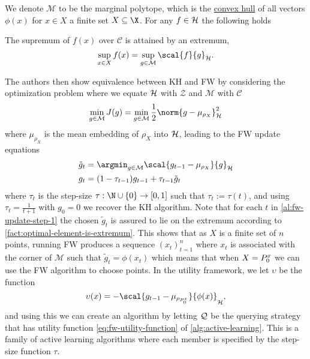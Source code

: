 We denote \(\mathcal{M}\) to be the marginal polytope, which is the
\hyperref[def:conv-hull]{convex hull} of all vectors \(\phi(x)\) for \(x \in X\)
a finite set \(X \subseteq \X\). For any \(f \in \mathcal{H}\) the following holds
\begin{fact}
  \label{fact:optimal-element-is-extremum}
  The supremum of \(f(x)\) over
  \(\mathcal{C}\) is attained by an extremum,
\begin{equation}
  \label{eq:optimal-element-is-extremum}
  \sup_{x \in X} f(x) = \sup_{g \in
    \mathcal{M}} \scal{f}{g}_{\rkhs{H}}.
\end{equation}
\end{fact}
The authors then show equivalence
between KH and FW by considering the optimization problem where we equate
\(\mathcal{H}\) with \(\mathcal{Z}\) and \(\mathcal{M}\) with \(\mathcal{C}\)
\begin{equation}
\label{eq:fw-kh-optimisation-problem} \min_{g \in \mathcal{M}} J(g) =
\min_{g \in \mathcal{M}}\frac{1}{2}\norm{g - \mu_{\rho_{X}}}_{\rkhs{H}}^{2}
\end{equation}
where \(\mu_{\rho_X}\) is the mean embedding of \(\rho_X\)
into \(\mathcal{H}\), leading to the FW update equations
\begin{align} \tilde{g}_{t} & = \argmin_{g \in \mathcal{M}} \scal{g_{t-1} -
\mu_{\rho_{X}}}{g}_{\rkhs{H}} \label{al:fw-update-step-1}\\ g_{t} & = (1 -
\tau_{t-1}) g_{t-1} + \tau_{t-1} \tilde{g}_{t} \label{al:fw-update-step-2}
\end{align}
where \(\tau_t\) is the step-size \(\tau: \N \cup \{0\} \to [0, 1]\) such that
\(\tau_t := \tau(t)\), and using \(\tau_{t} = \frac{1}{t+1}\) with \(g_0 = 0\)
we recover the KH algorithm. Note that for each \(t\) in \ref{al:fw-update-step-1} the chosen
\(\tilde{g}_{t}\) is assured to lie on the extremum according to
\ref{fact:optimal-element-is-extremum}. This shows that as \(X\) is a finite
set of \(n\) points, running FW produces a sequence \((x_{t})_{t=1}^{n}\) where
\(x_{t}\) is associated with the corner of \(\mathcal{M}\) such that
\(\tilde{g}_{t} = \phi(x_{t})\) which means that when \(X = P^x_{0}\) we
can use the FW algorithm to choose points. In the utility framework, we let
\(\upsilon\) be the function
\begin{equation}
\label{eq:fw-utility-function} \upsilon(x) = -\scal{g_{t-1} -
\mu_{\rho_{\poolsetx_{0}}}}{\phi(x)}_{\rkhs{H}},
\end{equation} and using this we can create an algorithm by letting
\(\mathcal{Q}\) be the querying strategy that has utility function
\ref{eq:fw-utility-function} of \ref{alg:active-learning}. This is a family of
active learning algorithms where each member is specified by the step-size function
\(\tau\).

